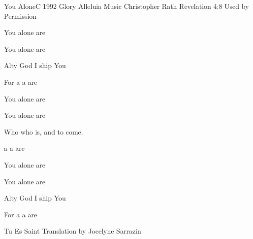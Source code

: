 \begin{song}{You Alone}{C}
  {1992 Glory Alleluia Music}
  {Christopher Rath}
  {Revelation 4:8}
  {Used by Permission}

  \renewcommand{\RevDate}{February~11,~1993}

  \begin{SBVerse}
       You alone are 

       You alone are 

    Alty God I ship You

    For  a  a are   
  \end{SBVerse}

  \begin{SBVerse}
      You alone are 

      You alone are 

    Who  who is, and  to come.

     a  a are  \Ch{[}{}\Ch{]}{} \Ch{[{$^{Mod.}$}}{}\Ch{]}{}
  \end{SBVerse}

  \begin{SBExtraKeys}{%

    \begin{SBVerse}
         You alone are 

         You alone are 

      Alty God I ship You

      For  a  a are   
    \end{SBVerse}
  }\end{SBExtraKeys}

\CBPageBrk
  \begin{xlatn}{Tu Es Saint}
    {}
    {Translation by Jocelyne Sarrazin}
    \renewcommand{\RevDate}{8~April,~1998}


\end{xlatn}
\end{song}
